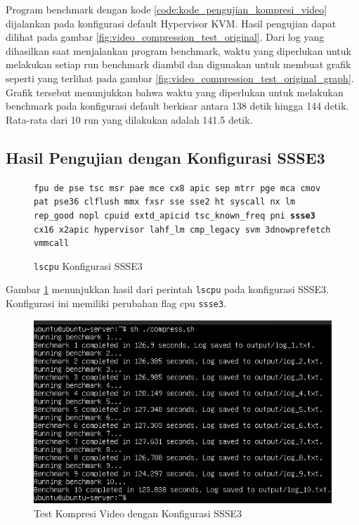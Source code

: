 Program benchmark dengan kode \ref{code:kode_pengujian_kompresi_video} dijalankan pada konfigurasi default Hypervisor KVM. Hasil pengujian dapat dilihat pada gambar \ref{fig:video_compression_test_original}. Dari log yang dihasilkan saat menjalankan program benchmark, waktu yang diperlukan untuk melakukan setiap run benchmark diambil dan digunakan untuk membuat grafik seperti yang terlihat pada gambar \ref{fig:video_compression_test_original_graph}. Grafik tersebut menunjukkan bahwa waktu yang diperlukan untuk melakukan benchmark pada konfigurasi default berkisar antara 138 detik hingga 144 detik. Rata-rata dari 10 run yang dilakukan adalah 141.5 detik.

\subsection{Hasil Pengujian dengan Konfigurasi SSSE3}
\begin{figure}
    \texttt{fpu de pse tsc msr pae mce cx8 apic sep mtrr pge mca cmov pat pse36 clflush mmx fxsr sse sse2 ht syscall nx lm rep\_good nopl cpuid extd\_apicid tsc\_known\_freq pni \textbf{ssse3} cx16 x2apic hypervisor lahf\_lm cmp\_legacy svm 3dnowprefetch vmmcall}
    \caption{\texttt{lscpu} Konfigurasi SSSE3}
    \label{fig:lscpu_video_compression_test_ssse3}
\end{figure}

Gambar \ref{fig:lscpu_video_compression_test_ssse3} menunjukkan hasil dari perintah \texttt{lscpu} pada konfigurasi SSSE3. Konfigurasi ini memiliki perubahan flag cpu \texttt{ssse3}.

\begin{figure}
    \centering
    \includegraphics[width=1\textwidth]
    {assets/pics/video-compression-test/ssse3.jpeg}
    \caption{Test Kompresi Video dengan Konfigurasi SSSE3}
    \label{fig:video_compression_test_ssse3}
\end{figure}

